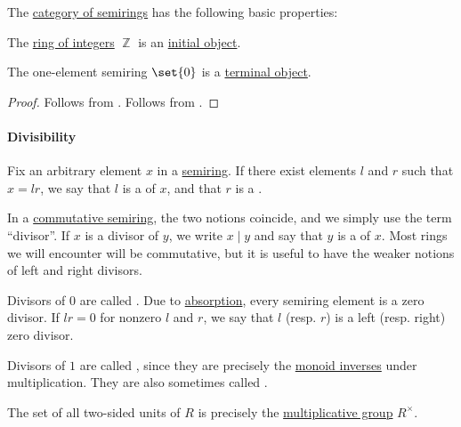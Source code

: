 \begin{proposition}\label{thm:category_of_semirings_properties}
  The \hyperref[def:semiring/category]{category of semirings} has the following basic properties:
  \begin{thmenum}
     The \hyperref[def:integers]{ring of integers} \( \BbbZ \) is an \hyperref[def:universal_objects/initial]{initial object}.

     The one-element semiring \( \set{ 0 } \) is a \hyperref[def:universal_objects/terminal]{terminal object}.
  \end{thmenum}
\end{proposition}
\begin{proof}
   Follows from .
   Follows from .
\end{proof}

\paragraph{Divisibility}

\begin{definition}\label{def:divisibility}\mimprovised
  Fix an arbitrary element \( x \) in a \hyperref[def:semiring]{semiring}. If there exist elements \( l \) and \( r \) such that \( x = lr \), we say that \( l \) is a  of \( x \), and that \( r \) is a .

  In a \hyperref[def:semiring/commutative]{commutative semiring}, the two notions coincide, and we simply use the term \enquote{divisor}. If \( x \) is a divisor of \( y \), we write \( x \mid y \) and say that \( y \) is a  of \( x \). Most rings we will encounter will be commutative, but it is useful to have the weaker notions of left and right divisors.

  \begin{thmenum}
     Divisors of \( 0 \) are called . Due to \hyperref[def:semiring/absorption]{absorption}, every semiring element is a zero divisor. If \( lr = 0 \) for nonzero \( l \) and \( r \), we say that \( l \) (resp. \( r \)) is a  left (resp. right) zero divisor.

     Divisors of \( 1 \) are called , since they are precisely the \hyperref[def:monoid_inverse]{monoid inverses} under multiplication. They are also sometimes called .
  \end{thmenum}
\end{definition}
\begin{comments}
  \item The set of all two-sided units of \( R \) is precisely the \hyperref[def:semiring]{multiplicative group} \( R^\times \).
\end{comments}

